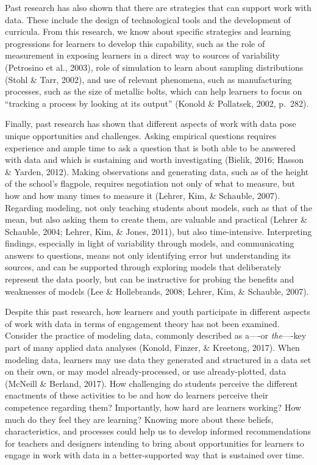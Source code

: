 \documentclass[]{msu-thesis}
\theoremstyle{definition}
\theoremstyle{definition}
\theoremstyle{definition}
\theoremstyle{remark}
\begin{document}
Past research has also shown that there are strategies that can support
work with data. These include the design of technological tools and the
development of curricula. From this research, we know about specific
strategies and learning progressions for learners to develop this
capability, such as the role of measurement in exposing learners in a
direct way to sources of variability (Petrosino et al., 2003), role of
simulation to learn about sampling distributions (Stohl \& Tarr, 2002),
and use of relevant phenomena, such as manufacturing processes, such as
the size of metallic bolts, which can help learners to focus on
``tracking a process by looking at its output'' (Konold \& Pollatsek,
2002, p.~282).

Finally, past research has shown that different aspects of work with
data pose unique opportunities and challenges. Asking empirical
questions requires experience and ample time to ask a question that is
both able to be answered with data and which is sustaining and worth
investigating (Bielik, 2016; Hasson \& Yarden, 2012). Making
observations and generating data, such as of the height of the school's
flagpole, requires negotiation not only of what to measure, but how and
how many times to measure it (Lehrer, Kim, \& Schauble, 2007). Regarding
modeling, not only teaching students about models, such as that of the
mean, but also asking them to create them, are valuable and practical
(Lehrer \& Schauble, 2004; Lehrer, Kim, \& Jones, 2011), but also
time-intensive. Interpreting findings, especially in light of
variability through models, and communicating answers to questions,
means not only identifying error but understanding its sources, and can
be supported through exploring models that deliberately represent the
data poorly, but can be instructive for probing the benefits and
weaknesses of models (Lee \& Hollebrands, 2008; Lehrer, Kim, \&
Schauble, 2007).

Despite this past research, how learners and youth participate in
different aspects of work with data in terms of engagement theory has
not been examined. Consider the practice of modeling data, commonly
described as a----or \emph{the}----key part of many applied data
analyses (Konold, Finzer, \& Kreetong, 2017). When modeling data,
learners may use data they generated and structured in a data set on
their own, or may model already-processed, or use already-plotted, data
(McNeill \& Berland, 2017). How challenging do students perceive the
different enactments of these activities to be and how do learners
perceive their competence regarding them? Importantly, how hard are
learners working? How much do they feel they are learning? Knowing more
about these beliefs, characteristics, and processes could help us to
develop informed recommendations for teachers and designers intending to
bring about opportunities for learners to engage in work with data in a
better-supported way that is sustained over time.
\end{document}
